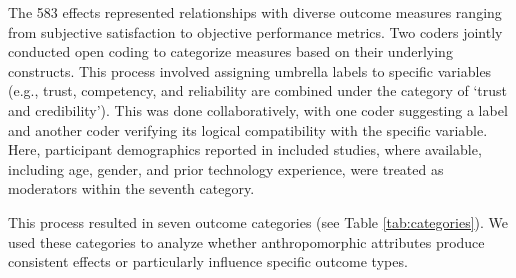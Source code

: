 \documentclass[manuscript,screen,review,anonymous]{acmart}
\DeclareRobustCommand{\change}[1]{%
    \textcolor{changeblue}{#1}%
  }
\DeclareRobustCommand{\change}[1]{#1}
\begin{document}
The 583 effects represented relationships with diverse outcome measures ranging from subjective satisfaction to objective performance metrics. Two coders jointly conducted open coding to categorize measures based on their underlying constructs. This process involved assigning umbrella labels to specific variables (e.g., trust, competency, and reliability are combined under the category of `trust and credibility'). This was done collaboratively, with one coder suggesting a label and another coder verifying its logical compatibility with the specific variable. %
\change{Here, participant demographics reported in included studies, where available, including age, gender, and prior technology experience, were treated as moderators within the seventh category.}
This process resulted in seven outcome categories (see Table \ref{tab:categories}). We used these categories to analyze whether anthropomorphic attributes produce consistent effects or particularly influence specific outcome types. %
\end{document}
